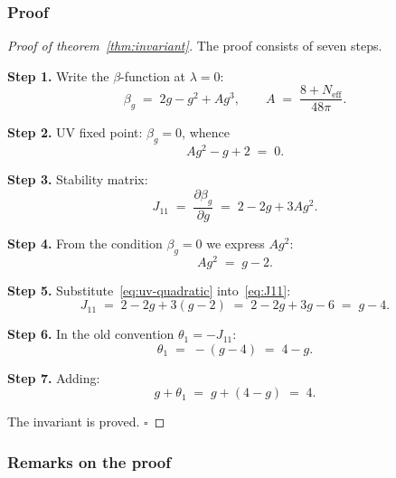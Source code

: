 \documentclass[11pt,a4paper]{article}
\theoremstyle{definition}
\begin{document}
\subsubsection{Proof}

\begin{proof}[Proof of theorem~\ref{thm:invariant}]
The proof consists of seven steps.

\medskip\noindent
\textbf{Step 1.} Write the $\beta$-function at $\lambda = 0$:
\begin{equation}
    \beta_g \;=\; 2g - g^2 + A g^3,
    \qquad A \;=\; \frac{8 + N_{\text{eff}}}{48\pi}.
    \tag{4.1}
\end{equation}

\medskip\noindent
\textbf{Step 2.} UV fixed point: $\beta_g = 0$, whence
\begin{equation}
    A g^2 - g + 2 \;=\; 0.
    \tag{4.2}
\end{equation}

\medskip\noindent
\textbf{Step 3.} Stability matrix:
\begin{equation}
    J_{11} \;=\; \frac{\partial \beta_g}{\partial g}
    \;=\; 2 - 2g + 3 A g^2.
    \tag{4.3}
\end{equation}

\medskip\noindent
\textbf{Step 4.} From the condition $\beta_g = 0$ we express $A g^2$:
\begin{equation}
    A g^2 \;=\; g - 2.
    \tag{4.4}
\end{equation}

\medskip\noindent
\textbf{Step 5.} Substitute~\eqref{eq:uv-quadratic} into~\eqref{eq:J11}:
\begin{equation}
    J_{11} \;=\; 2 - 2g + 3(g - 2)
    \;=\; 2 - 2g + 3g - 6
    \;=\; g - 4.
    \tag{4.5}
\end{equation}

\medskip\noindent
\textbf{Step 6.} In the old convention $\theta_1 = -J_{11}$:
\begin{equation}
    \theta_1 \;=\; -(g - 4) \;=\; 4 - g.
    \tag{4.6}
\end{equation}

\medskip\noindent
\textbf{Step 7.} Adding:
\begin{equation}
    g + \theta_1 \;=\; g + (4 - g) \;=\; 4.
\end{equation}

\noindent
The invariant is proved. $\square$
\end{proof}

\subsubsection{Remarks on the proof}
\end{document}
